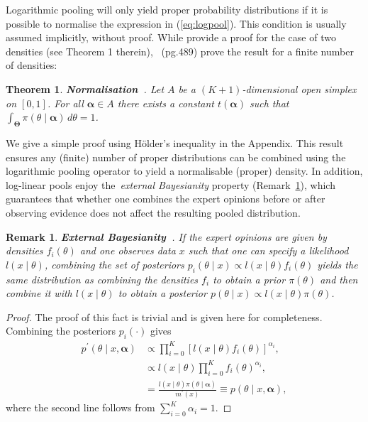 \documentclass[a4paper, notitlepage, 10pt]{article}
\newtheorem{theo}{Theorem}[]
\newtheorem{remark}{Remark}[]
\begin{document}
Logarithmic pooling will only yield proper probability distributions if it is possible to normalise the expression in (\ref{eq:logpool}).
This condition is usually assumed implicitly, without proof.
While \citet{Poole2000} provide a proof for the case of two densities (see Theorem 1 therein),~\cite{Genest1986A} (pg.489) prove the result for a finite number of densities:
\begin{theo}
\label{thm:normalisation}
\textbf{Normalisation~\citep{Genest1986A}}. 
Let $A$ be a $(K+1)$-dimensional open simplex on $[0,1]$.
For all $\boldsymbol\alpha \in A$ there exists a constant $t(\boldsymbol\alpha)$ such that $\int_{\boldsymbol\Theta}\pi(\theta \mid \boldsymbol \alpha)\, d\theta = 1$.
\end{theo}
We give a simple proof using H\"{o}lder's inequality in the Appendix.
This result ensures any (finite) number of proper distributions can be combined using the logarithmic pooling operator to yield a normalisable (proper) density.
In addition, log-linear pools enjoy the~\textit{external Bayesianity} property (Remark~\ref{rmk:properties_EB}), which guarantees that whether one combines the expert opinions before or after observing evidence does not affect the resulting pooled distribution.
\begin{remark}
\label{rmk:properties_EB}
 \textbf{External Bayesianity~\citep{Genest1984}}.
 If the expert opinions are given by densities $f_i(\theta)$ and one observes data $x$ such that one can specify a likelihood $l(x \mid \theta)$, combining the set of posteriors $p_i(\theta \mid x) \propto  l(x \mid \theta)f_i(\theta) $ yields the same distribution as combining the densities $f_i$ to obtain a prior $\pi(\theta)$ and then combine it with $l(x \mid \theta)$ to obtain a posterior $p(\theta \mid x) \propto l(x \mid \theta)\pi(\theta)$.
\end{remark}
\begin{proof}
 The proof of this fact is trivial and is given here for completeness.
 Combining the posteriors $p_i(\cdot)$ gives
 \begin{align*}
  p^\prime (\theta \mid x, \boldsymbol \alpha) &\propto \prod_{i = 0}^K \left[  l(x \mid \theta)f_i(\theta) \right]^{\alpha_i},\\
  &\propto   l(x \mid \theta) \prod_{i = 0}^K f_i(\theta)^{\alpha_i},\\
  &=  \frac{l(x \mid \theta)\pi(\theta \mid \boldsymbol \alpha)}{m^{\prime}(x)} \equiv   p(\theta \mid x, \boldsymbol \alpha),
 \end{align*}
 where the second line follows from $\sum_{i=0}^K \alpha_i = 1$.
\end{proof}
\end{document}
